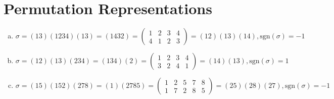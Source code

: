 \documentclass[12pt]{article}
\begin{document}
\section{Permutation Representations}
\begin{enumerate}[(a)]
\item $\sigma = (1 3)(1 2 3 4)(1 3) = (1 4 3 2) = \begin{pmatrix} 1 & 2 &3 &4\\ 4 &1 &2 &3 \end{pmatrix} = (12)(13)(14), \mathrm{sgn}(\sigma) = -1$ 
\item $\sigma = (1 2)(1 3)(2 3 4) = (1 3 4)(2) = \begin{pmatrix} 1 & 2 & 3 & 4 \\ 3 & 2 & 4 & 1 \end{pmatrix} = (14)(13), \mathrm{sgn}(\sigma) = 1$
\item $\sigma = (1 5)(1 5 2)(2 7 8) = (1)(2 7 8 5) = \begin{pmatrix} 1 & 2 & 5 & 7 & 8 \\ 1 & 7 & 2 & 8 & 5\end{pmatrix} = (2 5)(2 8)(2 7), \mathrm{sgn}(\sigma) = -1$
\end{enumerate}
\end{document}

